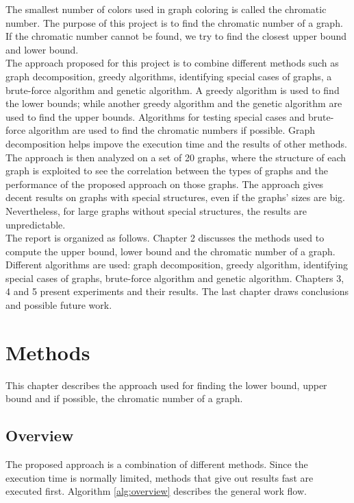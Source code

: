 \documentclass[a4paper]{report}
\begin{document}
	The smallest number of colors used in graph coloring is called the chromatic number. The purpose of this project is to find the chromatic number of a graph. If the chromatic number cannot be found, we try to find the closest upper bound and lower bound.\\
	
	The approach proposed for this project is to combine different methods such as graph decomposition, greedy algorithms, identifying special cases of graphs, a brute-force algorithm and genetic algorithm. A greedy algorithm is used to find the lower bounds; while another greedy algorithm and the genetic algorithm are used to find the upper bounds. Algorithms for testing special cases and brute-force algorithm are used to find the chromatic numbers if possible. Graph decomposition helps impove the execution time and the results of other methods. The approach is then analyzed on a set of 20 graphs, where the structure of each graph is exploited to see the correlation between the types of graphs and the performance of the proposed approach on those graphs. The approach gives decent results on graphs with special structures, even if the graphs' sizes are big. Nevertheless, for large graphs without special structures, the results are unpredictable. \\

	The report is organized as follows. Chapter 2 discusses the methods used to compute the upper bound, lower bound and the chromatic number of a graph. Different algorithms are used: graph decomposition, greedy algorithm, identifying special cases of graphs, brute-force algorithm and genetic algorithm. Chapters 3, 4 and 5 present experiments and their results. The last chapter draws conclusions and possible future work.
	
	\chapter{Methods}
	This chapter describes the approach used for finding the lower bound, upper bound and if possible, the chromatic number of a graph. 
	\section{Overview}
	The proposed approach is a combination of different methods. Since the execution time is normally limited, methods that give out results fast are executed first. Algorithm \ref{alg:overview} describes the general work flow.\\
	
\end{document}
